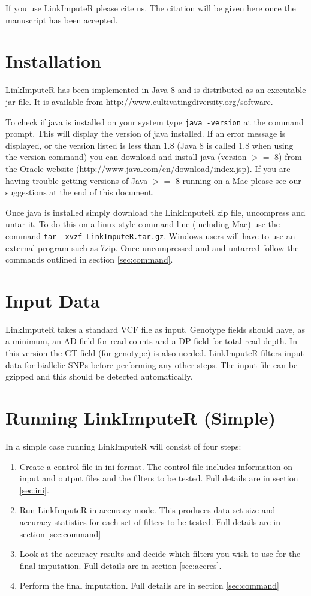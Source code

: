 \documentclass[10pt]{report}
\begin{document}
If you use LinkImputeR please cite us.  The citation will be given here once the manuscript has been accepted.


\section{Installation}

LinkImputeR has been implemented in Java 8 and is distributed as an executable jar file.  It is available from \url{http://www.cultivatingdiversity.org/software}.

To check if java is installed on your system type \texttt{java -version} at the command prompt.  This will display the version of java installed.  If an error message is displayed, or the version listed is less than 1.8 (Java 8 is called 1.8 when using the version command) you can download and install java (version $>=$ 8) from the Oracle website (\url{http://www.java.com/en/download/index.jsp}).  If you are having trouble getting versions of Java $>=$ 8 running on a Mac please see our suggestions at the end of this document.

Once java is installed simply download the LinkImputeR zip file, uncompress and untar it.  To do this on a linux-style command line (including Mac) use the command \texttt{tar -xvzf LinkImputeR.tar.gz}.  Windows users will have to use an external program such as 7zip.  Once uncompressed and and untarred follow the commands outlined in section \ref{sec:command}.

\section{Input Data}

LinkImputeR takes a standard VCF file as input.  Genotype fields should have, as a minimum, an AD field for read counts and a DP field for total read depth.  In this version the GT field (for genotype) is also needed.  LinkImputeR filters input data for biallelic SNPs before performing any other steps.  The input file can be gzipped and this should be detected automatically.

\section{Running LinkImputeR (Simple)}
In a simple case running LinkImputeR will consist of four steps:
\begin{enumerate}
\item Create a control file in ini format.  The control file includes information on input and output files and the filters to be tested.  Full details are in section \ref{sec:ini}.
\item Run LinkImputeR in accuracy mode.  This produces data set size and accuracy statistics for each set of filters to be tested.  Full details are in section \ref{sec:command}
\item Look at the accuracy results and decide which filters you wish to use for the final imputation.  Full details are in section \ref{sec:accres}.
\item Perform the final imputation.  Full details are in section \ref{sec:command}
\end{enumerate}
\end{document}

